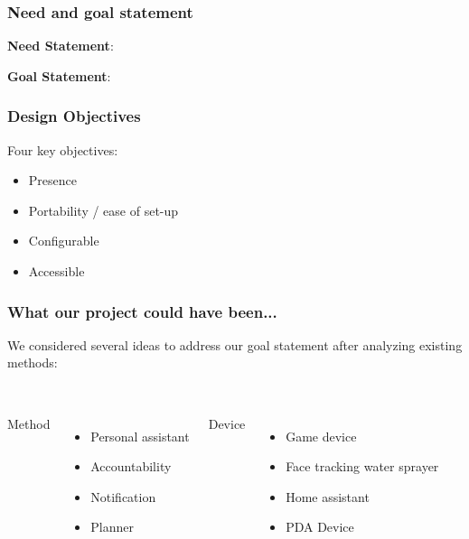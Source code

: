 \documentclass{beamer}
\begin{document}
\frame{\titlepage}

\begin{frame}
  \frametitle{Need and goal statement}
  \textbf{Need Statement}:
  
  \newline
  \newline
  \textbf{Goal Statement}:
   \\
\end{frame}

\begin{frame}
  \frametitle{Design Objectives}
  Four key objectives:
  \begin{itemize}
    \item Presence
    \item Portability / ease of set-up
    \item Configurable
    \item Accessible
  \end{itemize}

\end{frame}

\begin{frame}
  \frametitle{What our project could have been...}
  We considered several ideas to address our goal statement after analyzing existing methods:
  \\~\\
  \begin{columns}
    Method
    \begin{itemize}
      \item Personal assistant
      \item Accountability
      \item Notification
      \item Planner
    \end{itemize}

    Device
    \begin{itemize}
      \item Game device
      \item Face tracking water sprayer
      \item Home assistant
      \item PDA Device
    \end{itemize}

  \end{columns}

\end{frame}
\end{document}

